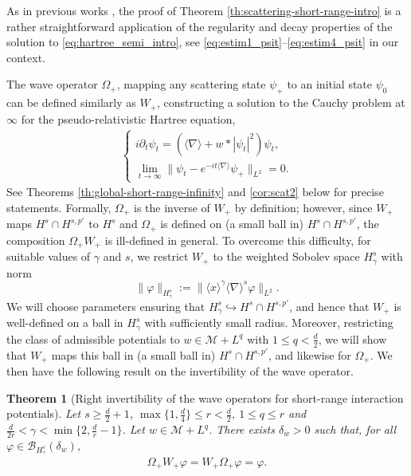 \documentclass[12pt]{article}
\theoremstyle{plain}
\newtheorem{theo}{Theorem}[section]
\newcommand{\meas}{\mathcal{M}}
\begin{document}
As in previous works \cites{ChoOzawa1,ChoOzawa2,ChoOzawaSazaki}, the proof of Theorem \ref{th:scattering-short-range-intro} is a rather straightforward application of the regularity and decay properties of the solution to \eqref{eq:hartree_semi_intro}, see \eqref{eq:estim1_psit}--\eqref{eq:estim4_psit} in our context.


The wave operator $\Omega_+$, mapping any scattering state $\psi_+$ to an initial state $\psi_0$ can be defined similarly as $W_+$, constructing a solution to the Cauchy problem at $\infty$ for the pseudo-relativistic Hartree equation,
\begin{align}
	\label{eq: hartree semir infinity}
	\begin{cases}
				i\partial_t \psi_t = (\langle\nabla\rangle + w*|\psi_t|^2)\psi_t, \\
    \lim_{t\to\infty}\|\psi_t-e^{-it\langle\nabla\rangle}\psi_+\|_{L^2}=0. 
	\end{cases}
\end{align}
See Theorems \ref{th:global-short-range-infinity} and \ref{cor:scat2} below for precise statements. Formally, $\Omega_+$ is the inverse of $W_+$ by definition; however, since $W_+$ maps $H^s\cap H^{s,p'}$ to $H^s$ and $\Omega_+$ is defined on (a small ball in) $H^s\cap H^{s,p'}$, the composition $\Omega_+W_+$ is ill-defined in general. To overcome this difficulty, for suitable values of $\gamma$ and $s$, we restrict $W_+$ to the weighted Sobolev space $H^s_\gamma$ with norm
\begin{equation*}
    \|\varphi\|_{H^s_\gamma}:=\|\langle x\rangle^\gamma\langle\nabla\rangle^s\varphi\|_{L^2}.
\end{equation*}
We will choose parameters ensuring that $H^s_\gamma\hookrightarrow H^s\cap H^{s,p'}$, and hence that $W_+$ is well-defined on a ball in $H^s_\gamma$ with sufficiently small radius. Moreover, restricting the class of admissible potentials to $w\in\mathcal{M}+L^q$ with $1\le q<\frac{d}{2}$, we will show that $W_+$ maps this ball in (a small ball in) $H^s\cap H^{s,p'}$, and likewise for $\Omega_+$. We then have the following result on the invertibility of the wave operator.

\begin{theo}[Right invertibility of the wave operators for short-range interaction potentials]\label{thm:invertibility-intro}
    Let $s\ge\frac d2+1$, $\max\{1,\frac{d}{4}\}\le r<\frac{d}{2}$, $1\le q\le r$ and $\frac{d}{2r}<\gamma<\min\{2,\frac dr-1\}$. Let $w \in \meas + L^q$.  There exists $\delta_w>0$ such that, for all $\varphi\in\mathcal{B}_{H^s_\gamma}(\delta_w)$,
	\begin{align}\label{eq:inverse-intro}
		\Omega_+W_+\varphi=W_+\Omega_+\varphi=\varphi.
	\end{align}
\end{theo}
\end{document}
